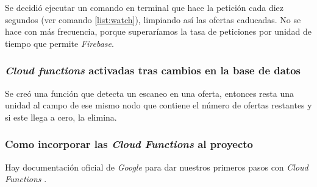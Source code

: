 Se decidió ejecutar un comando en terminal que hace la petición cada diez segundos (ver comando \ref{list:watch}), limpiando así las ofertas caducadas. No se hace con más frecuencia, porque superaríamos la tasa de peticiones por unidad de tiempo que permite \textit{Firebase}.


\subsubsection*{\textit{Cloud functions} activadas tras cambios en la base de datos}
Se creó una función que detecta un escaneo en una oferta, entonces resta una unidad al campo de ese mismo nodo que contiene el número de ofertas restantes y si este llega a cero, la elimina.

\subsubsection*{Como incorporar las \textit{Cloud Functions} al proyecto}
Hay documentación oficial de \textit{Google} para dar nuestros primeros pasos con \textit{Cloud Functions} \cite{noauthor_documentacion_nodate}.

